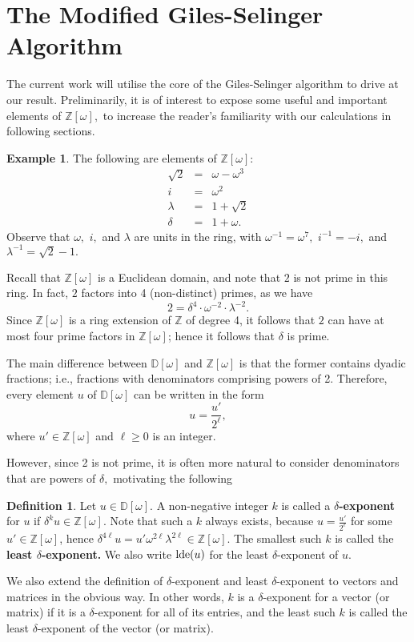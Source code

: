 \documentclass{dalthesis}
\theoremstyle{theorem}
\theoremstyle{definition}
\newtheorem{definition}[theorem]{Definition}
\theoremstyle{definition}  %
\newtheorem{example}[theorem]{Example}
\theoremstyle{definition}
\newcommand{\Z}{\mathbb{Z}}
\newcommand{\D}{\mathbb{D}}
\renewcommand{\:}{\mathbin{:}}
\newcommand{\lde}{\mathop{\rm lde}\nolimits}
\begin{document}
\section{The Modified Giles-Selinger Algorithm}

The current work will utilise the core of the Giles-Selinger algorithm to drive at our result. Preliminarily, it is of interest to expose some useful and important elements of $\Z[\omega],$ to increase the reader's familiarity with our calculations in following sections.

\begin{example}
\label{RingsExample} The following are elements of $\Z[\omega]$:
\[\begin{array}{ccc}
\sqrt{2}&=&\omega - \omega^3\\
i&=&\omega^2\\
\lambda &=& 1+\sqrt{2}\\
\delta &=& 1+\omega.
\end{array}
\]
Observe that $\omega,$ $i,$ and $\lambda$ are units in the ring, with $\omega^{-1} = \omega^7,$ $i^{-1} = -i,$ and $\lambda^{-1} = \sqrt{2} - 1.$
\end{example}

Recall that $\Z[\omega]$ is a Euclidean domain, and note that $2$ is not prime in this ring. In fact, $2$ factors into 4 (non-distinct) primes, as we have \[
2 = \delta^4\cdot\omega^{-2}\cdot\lambda^{-2}.
\]
Since $\Z[\omega]$ is a ring extension of $\Z$ of degree 4, it follows that $2$ can have at most four prime factors in $\Z[\omega]$; hence it follows that $\delta$ is prime.

The main difference between $\D[\omega]$ and $\Z[\omega]$ is that the former contains dyadic fractions; i.e., fractions with denominators comprising powers of 2. Therefore, every element $u$ of $\D[\omega]$ can be written in the form \[
u = \frac{u'}{2^\ell},
\]
where $u'\in\Z[\omega]$ and $\ell\geq 0$ is an integer.

However, since 2 is not prime, it is often more natural to consider denominators that are powers of $\delta,$ motivating the following

\begin{definition}
\label{LeastDen2Def}
Let $u\in\D[\omega].$ A non-negative integer $k$ is called a \textbf{$\delta$-exponent} for $u$ if $\delta^ku\in\Z[\omega].$ Note that such a $k$ always exists, because $u=\frac{u'}{2^\ell}$ for some $u'\in\Z[\omega]$, hence $\delta^{4\ell}u=u'\omega^{2\ell}\lambda^{2\ell}\in\Z[\omega]$. The smallest such $k$ is called the \textbf{least $\delta$-exponent.} We also write $\lde(u)$ for the least $\delta$-exponent of $u$. 

We also extend the definition of $\delta$-exponent and least $\delta$-exponent to vectors and matrices in the obvious way. In other words, $k$ is a $\delta$-exponent for a vector (or matrix) if it is a $\delta$-exponent for all of its entries, and the least such $k$ is called the least $\delta$-exponent of the vector (or matrix).
\end{definition}
\end{document}
